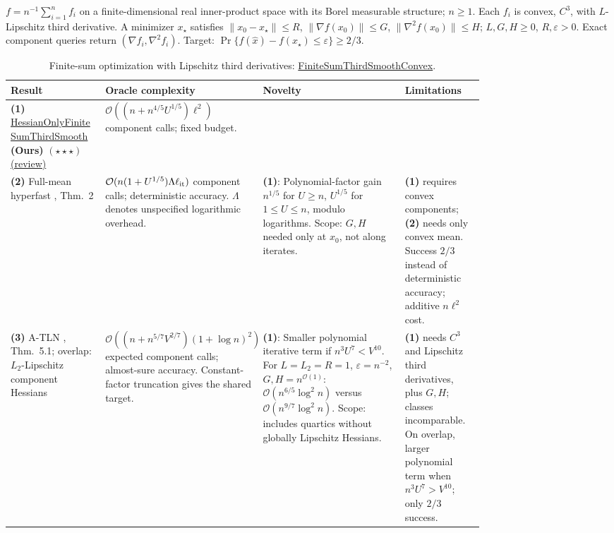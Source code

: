 \begin{table}[tp]
\centering
\caption{Finite-sum optimization with Lipschitz third derivatives: \href{https://github.com/k3nfalt/longtails/blob/main/LongTails/Setups/FiniteSumThirdSmoothConvex.lean}{FiniteSumThirdSmoothConvex}.}\label{tab:FiniteSumThirdSmoothConvex}
\parbox{\linewidth}{\footnotesize $f=n^{-1}\sum_{i=1}^n f_i$ on a finite-dimensional real inner-product space with its Borel measurable structure; $n\ge1$. Each $f_i$ is convex, $C^3$, with $L$-Lipschitz third derivative. A minimizer $x_\star$ satisfies $\|x_0-x_\star\|\le R$, $\|\nabla f(x_0)\|\le G$, $\|\nabla^2f(x_0)\|\le H$; $L,G,H\ge0$, $R,\varepsilon>0$. Exact component queries return $(\nabla f_i,\nabla^2 f_i)$. Target: $\Pr\{f(\hat x)-f(x_\star)\le\varepsilon\}\ge2/3$.}\par\smallskip
\begin{threeparttable}
\footnotesize
\setlength{\tabcolsep}{4pt}\renewcommand{\arraystretch}{1.25}
\begin{tabularx}{\linewidth}{@{}>{\raggedright\arraybackslash}p{0.20\linewidth}>{\raggedright\arraybackslash}p{0.28\linewidth}>{\raggedright\arraybackslash}p{0.30\linewidth}>{\raggedright\arraybackslash}X@{}}
\toprule
\textbf{Result} & \textbf{Oracle complexity} & \textbf{Novelty} & \textbf{Limitations} \\
\midrule
\textbf{(1)} \href{https://github.com/k3nfalt/longtails/blob/main/LongTails/Theorems/HessianOnlyFiniteSumThirdSmooth.lean}{Hessian\allowbreak Only\allowbreak Finite\allowbreak Sum\allowbreak Third\allowbreak Smooth} \textbf{(Ours)} $(\star\star\star)$ \href{https://github.com/k3nfalt/longtails/blob/main/scripts/reviews/HessianOnlyFiniteSumThirdSmooth.md}{(review)} & $\mathcal{O}((n+n^{4/5}U^{1/5})\ell^2)$ component calls; fixed budget. & & \\
\midrule[1.2pt]
\textbf{(2)} Full-mean hyperfast \citep{fstKamzolov2020v3}, Thm.~2 & $\mathcal{O}(n(1+U^{1/5})\Lambda\ell_{\rm it})$ component calls; deterministic accuracy. $\Lambda$ denotes unspecified logarithmic overhead. & \textbf{(1)}: Polynomial-factor gain $n^{1/5}$ for $U\ge n$, $U^{1/5}$ for $1\le U\le n$, modulo logarithms. Scope: $G,H$ needed only at $x_0$, not along iterates. & \textbf{(1)} requires convex components; \textbf{(2)} needs only convex mean. Success $2/3$ instead of deterministic accuracy; additive $n\ell^2$ cost. \\
\midrule
\textbf{(3)} A-TLN \citep{fstZhang2026v1}, Thm.~5.1; overlap: $L_2$-Lipschitz component Hessians & $\mathcal{O}((n+n^{5/7}V^{2/7})(1+\log n)^2)$ expected component calls; almost-sure accuracy. Constant-factor truncation gives the shared target. & \textbf{(1)}: Smaller polynomial iterative term if $n^3U^7<V^{10}$. For $L=L_2=R=1$, $\varepsilon=n^{-2}$, $G,H=n^{\mathcal{O}(1)}$: $\mathcal{O}(n^{6/5}\log^2 n)$ versus $\mathcal{O}(n^{9/7}\log^2 n)$. Scope: includes quartics without globally Lipschitz Hessians. & \textbf{(1)} needs $C^3$ and Lipschitz third derivatives, plus $G,H$; classes incomparable. On overlap, larger polynomial term when $n^3U^7>V^{10}$; only $2/3$ success. \\

\end{tabularx}
\end{threeparttable}
\end{table}
